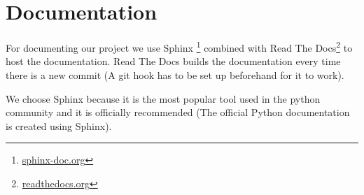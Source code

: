 \section{Documentation}

For documenting our project we use Sphinx
\footnote{\href{http://www.sphinx-doc.org}{sphinx-doc.org}} combined with Read
The Docs\footnote{\href{https://readthedocs.org}{readthedocs.org}} to host the
documentation. Read The Docs builds the documentation every time there is a new
commit (A git hook has to be set up beforehand for it to work).

We choose Sphinx because it is the most popular tool used in the python
community and it is officially recommended (The official Python documentation is
created using Sphinx).
